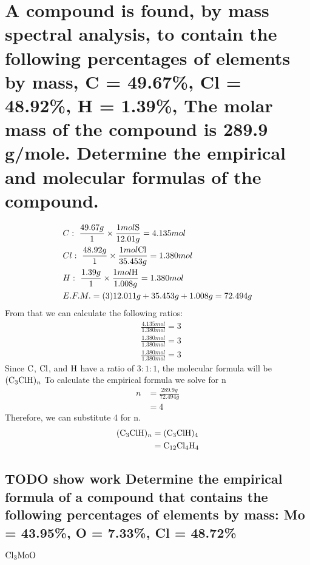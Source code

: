 \documentclass[11pt]{article}
\begin{document}
\section{A compound is found, by mass spectral analysis, to contain the following percentages of elements by mass, C = 49.67\%, Cl = 48.92\%, H = 1.39\%, The molar mass of the compound is 289.9 g/mole. Determine the empirical and molecular formulas of the compound.}
\label{sec:orga9c9f18}
\begin{align*}
&C:\ \frac{49.67g}{1}\times\frac{1mol\ce{S}}{12.01g}=4.135mol\\
&Cl:\ \frac{48.92g}{1}\times\frac{1mol\ce{Cl}}{35.453g}=1.380mol\\
&H:\ \frac{1.39g}{1}\times\frac{1mol\ce{H}}{1.008g}=1.380mol\\
&E.F.M.=(3)12.011g+35.453g+1.008g=72.494g
\end{align*}
From that we can calculate the following ratios:
\begin{align*}
&\frac{4.135mol}{1.380mol}=3\\
&\frac{1.380mol}{1.380mol}=3\\
&\frac{1.380mol}{1.380mol}=3
\end{align*}
Since \(\ce{C}\), \(\ce{Cl}\), and  \(\ce{H}\) have a ratio of \(3:1:1\), the molecular formula will be \(\ce{(C3ClH)_n}\) To calculate the empirical formula we solve for n
\begin{align*}
n&=\frac{289.9g}{72.494g}\\
&=4
\end{align*}
Therefore, we can substitute 4 for n.
\begin{align*}
\ce{(C3ClH)_n}&=\ce{(C3ClH)4}\\
&=\ce{C12Cl4H4}
\end{align*}

\subsection{{\bfseries\sffamily TODO} show work Determine the empirical formula of a compound that contains the following percentages of elements by mass: Mo = 43.95\%, O = 7.33\%, Cl = 48.72\%}
\label{sec:orgf966e66}
\(\ce{Cl3MoO}\)
\end{document}
